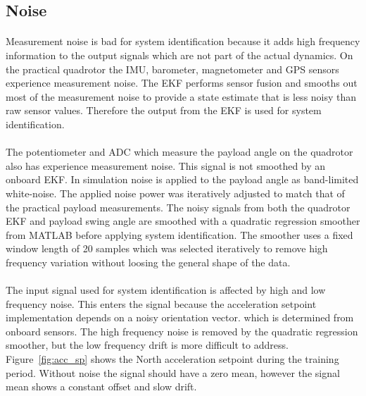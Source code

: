     \subsection{Noise}

        \paragraph{}
        Measurement noise is bad for system identification because it adds high frequency information to the output signals
        which are not part of the actual dynamics.
        On the practical quadrotor the IMU, barometer, magnetometer and GPS sensors experience measurement noise.
        The EKF performs sensor fusion and smooths out most of the measurement noise 
        to provide a state estimate that is less noisy than raw sensor values.
        Therefore the output from the EKF is used for system identification.
        
        \paragraph{}
        The potentiometer and ADC which measure the payload angle on the quadrotor also has experience measurement noise.
        This signal is not smoothed by an onboard EKF.
        In simulation noise is applied to the payload angle as band-limited white-noise.
        The applied noise power was iteratively adjusted to match that of the practical payload measurements.
        The noisy signals from both the quadrotor EKF and payload swing angle are smoothed 
        with a quadratic regression smoother from MATLAB\textsuperscript{\textregistered} before applying system identification.
        The smoother uses a fixed window length of 20 samples which was selected iteratively 
        to remove high frequency variation without loosing the general shape of the data.

        
        
        \paragraph{}
        The input signal used for system identification is affected by high and low frequency noise.
        This enters the signal because the acceleration setpoint implementation depends on a noisy orientation vector.
        which is determined from onboard sensors.
        The high frequency noise is removed by the quadratic regression smoother, 
        but the low frequency drift is more difficult to address.
        Figure~\ref{fig:acc_sp} shows the North acceleration setpoint during the training period.
        Without noise the signal should have a zero mean, 
        however the signal mean shows a constant offset and slow drift.
        
